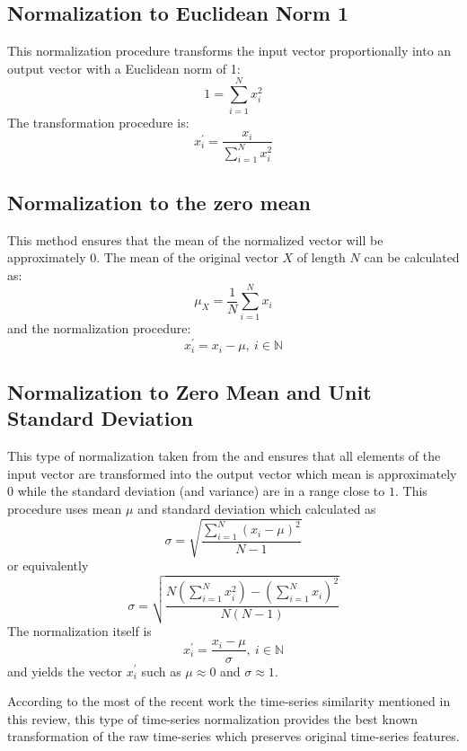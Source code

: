 \subsection{Normalization to Euclidean Norm 1}
This normalization procedure transforms the input vector proportionally into an output vector with a Euclidean norm of 1:
\[
1 = \sum_{i=1}^{N} x_{i}^{2}
\]
The transformation procedure is:
\[
x_{i}^{'} = \frac{ x_{i} }{ \sum_{i=1}^{N} x_{i}^2 }
\]

\subsection{Normalization to the zero mean}
This method ensures that the mean of the normalized vector will be approximately $0$. The mean of the original vector $X$ of length $N$ can be calculated as:
\[
\mu_{X} = \frac{1}{N}\sum_{i=1}^{N}x_{i}
\]
and the normalization procedure:
\[
x_{i}^{'} = x_{i} - \mu, \: i \in \mathbb{N}
\]


\subsection{Normalization to Zero Mean and Unit Standard Deviation}
This type of normalization taken from the \cite{citeulike:3815880} and ensures that all elements of the input vector are transformed into the output vector which mean is approximately $0$ while the standard deviation (and variance) are in a range close to $1$.
This procedure uses mean $\mu$ and standard deviation which calculated as 
\[
\sigma = \sqrt{ \frac{ \sum_{i=1}^{N} (x_{i} - \mu)^{2} }{ N - 1 } }
\]
or equivalently
\[
\sigma = \sqrt{ \frac{
                  N \left( \sum_{i=1}^{N} x_{i}^{2}  \right) - 
                  \left( \sum_{i=1}^{N} x_{i} \right) ^{2}
                }{
                  N(N-1)
                }  
          }
\]
The normalization itself is 
\[
x_{i}^{'} = \frac{x_{i} - \mu}{\sigma}, \: i \in \mathbb{N}
\]
and yields the vector $x_{i}^{'}$ such as $\mu \approx 0$ and $\sigma \approx 1$.

According to the most of the recent work \cite{citeulike:3815880} \cite{citeulike:2821475} \cite{citeulike:3978002} the time-series similarity mentioned in this review, this type of time-series normalization provides the best known transformation of the raw time-series which preserves original time-series features.